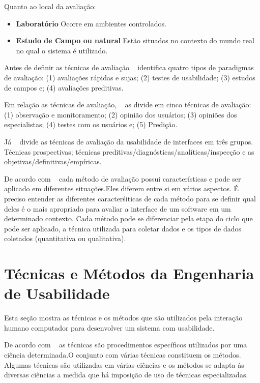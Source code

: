 	Quanto ao local da avaliação:

	\begin{itemize}
		\item \textbf{Laboratório} Ocorre em ambientes controlados.
		\item \textbf{Estudo de Campo ou natural} Estão situados no contexto do mundo real no qual o sistema é utilizado.
	\end{itemize}

	 
	Antes de definir as técnicas de avaliação ~ identifica quatro tipos de paradigmas de avaliação: (1) avaliações rápidas e sujas; (2) testes de usabilidade; (3) estudos de campos e; (4) avaliações preditivas.

	Em relação as técnicas de avaliação, ~ as divide em cinco técnicas de avaliação: (1) observação e monitoramento; (2) opinião dos usuários; (3) opiniões dos especialistas; (4) testes com os usuários e; (5) Predição. 

	Já ~ divide as técnicas de avaliação da usabilidade de interfaces em três grupos. Técnicas prospectivas; técnicas preditivas/diagnósticas/analíticas/inspecção e as objetivas/definitivas/empíricas.

	De acordo com ~ cada método de avaliação possui características e pode ser aplicado em diferentes situações.Eles diferem entre si em vários aspectos. É preciso entender as diferentes caracterśiticas de cada método para se definir qual deles é o mais apropriado para avaliar a interface de um software em um determinado contexto. Cada método pode se diferenciar pela etapa do ciclo que pode ser aplicado, a técnica utilizada para coletar dados e os tipos de dados coletados (quantitativa ou qualitativa).


\section{Técnicas e Métodos da Engenharia de Usabilidade}

	Esta seção mostra as técnicas e os métodos que são utilizados pela interação humano computador para desenvolver um sistema com usabilidade.

	De acordo com ~ as técnicas são procedimentos específicos utilizados por uma ciência determinada.O conjunto com várias técnicas constituem os métodos. Algumas técnicas são utilizadas em várias ciências e os métodos se adapta às diversas ciências a medida que há imposição de uso de técnicas especializadas.

